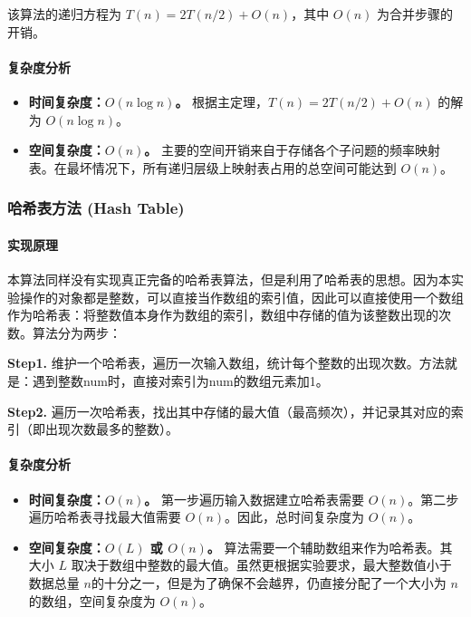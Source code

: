 \documentclass[UTF8,12pt,a4paper]{ctexart}
\begin{document}
该算法的递归方程为 $T(n) = 2T(n/2) + O(n)$，其中 $O(n)$ 为合并步骤的开销。

\paragraph{复杂度分析}
\begin{itemize}
    \item \textbf{时间复杂度：$O(n\log n)$。} 根据主定理，$T(n) = 2T(n/2) + O(n)$ 的解为 $O(n\log n)$。
    \item \textbf{空间复杂度：$O(n)$。} 主要的空间开销来自于存储各个子问题的频率映射表。在最坏情况下，所有递归层级上映射表占用的总空间可能达到 $O(n)$。
\end{itemize}

\subsubsection{哈希表方法 (Hash Table)}
\paragraph{实现原理}
本算法同样没有实现真正完备的哈希表算法，但是利用了哈希表的思想。因为本实验操作的对象都是整数，可以直接当作数组的索引值，因此可以直接使用一个数组作为哈希表：将整数值本身作为数组的索引，数组中存储的值为该整数出现的次数。算法分为两步：

\textbf{Step1. }维护一个哈希表，遍历一次输入数组，统计每个整数的出现次数。方法就是：遇到整数num时，直接对索引为num的数组元素加1。

\textbf{Step2. }遍历一次哈希表，找出其中存储的最大值（最高频次），并记录其对应的索引（即出现次数最多的整数）。

\paragraph{复杂度分析}
\begin{itemize}
    \item \textbf{时间复杂度：$O(n)$。} 第一步遍历输入数据建立哈希表需要 $O(n)$。第二步遍历哈希表寻找最大值需要 $O(n)$。因此，总时间复杂度为 $O(n)$。
    \item \textbf{空间复杂度：$O(L)$ 或 $O(n)$。} 算法需要一个辅助数组来作为哈希表。其大小 $L$ 取决于数组中整数的最大值。虽然更根据实验要求，最大整数值小于数据总量 $n$的十分之一，但是为了确保不会越界，仍直接分配了一个大小为 $n$ 的数组，空间复杂度为 $O(n)$。
\end{itemize}
\end{document}

